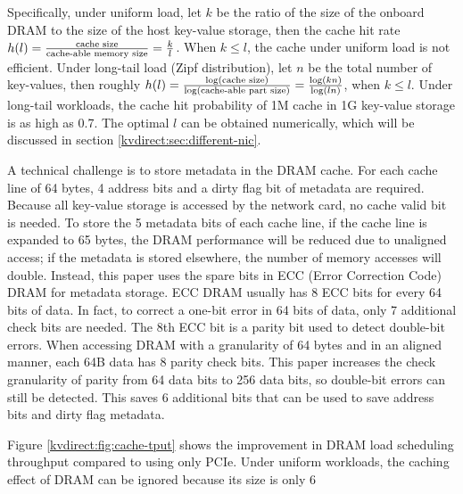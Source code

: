 Specifically, under uniform load, let $k$ be the ratio of the size of the onboard DRAM to the size of the host key-value storage, then the cache hit rate $h(l) = \frac{\textnormal{cache size}}{\textnormal{cache-able memory size}} = \frac{k}{l}$. When $k \leq l$, the cache under uniform load is not efficient. Under long-tail load (Zipf distribution), let $n$ be the total number of key-values, then roughly $h(l) = \frac{\log (\textnormal{cache size})}{\log (\textnormal{cache-able part size})} = \frac{\log (kn)}{\log (ln)}$, when $k \leq l$. Under long-tail workloads, the cache hit probability of 1M cache in 1G key-value storage is as high as 0.7. The optimal $l$ can be obtained numerically, which will be discussed in section \ref{kvdirect:sec:different-nic}.

A technical challenge is to store metadata in the DRAM cache. For each cache line of 64 bytes, 4 address bits and a dirty flag bit of metadata are required. Because all key-value storage is accessed by the network card, no cache valid bit is needed. To store the 5 metadata bits of each cache line, if the cache line is expanded to 65 bytes, the DRAM performance will be reduced due to unaligned access; if the metadata is stored elsewhere, the number of memory accesses will double. Instead, this paper uses the spare bits in ECC (Error Correction Code) DRAM for metadata storage. ECC DRAM usually has 8 ECC bits for every 64 bits of data. In fact, to correct a one-bit error in 64 bits of data, only 7 additional check bits are needed. The 8th ECC bit is a parity bit used to detect double-bit errors. When accessing DRAM with a granularity of 64 bytes and in an aligned manner, each 64B data has 8 parity check bits. This paper increases the check granularity of parity from 64 data bits to 256 data bits, so double-bit errors can still be detected. This saves 6 additional bits that can be used to save address bits and dirty flag metadata.

Figure \ref {kvdirect:fig:cache-tput} shows the improvement in DRAM load scheduling throughput compared to using only PCIe. Under uniform workloads, the caching effect of DRAM can be ignored because its size is only 6%

